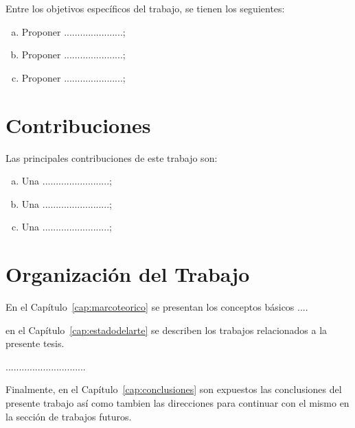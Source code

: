 Entre los objetivos específicos del trabajo, se tienen los seguientes:

\begin{enumerate}[(a)]
\item Proponer  ......................;
\item Proponer  ......................;
\item Proponer  ......................;
\end{enumerate}

\section{Contribuciones}
\label{sec:contribuciones}
Las principales contribuciones de este trabajo son:

\begin{enumerate}[(a)]
	\item Una .........................;
	\item Una .........................;
	\item Una .........................;
	
\end{enumerate}

\section{Organización del Trabajo}
\label{sec:organizaciondeltrabajo}
En el Capítulo~\ref{cap:marcoteorico} se presentan los conceptos básicos ....

en el Capítulo~\ref{cap:estadodelarte} se describen los trabajos relacionados a la presente tesis.

..............................

Finalmente, en el Capítulo~\ref{cap:conclusiones} son expuestos las conclusiones del presente trabajo así como 
tambien las direcciones para continuar con el mismo en la sección de trabajos futuros.



